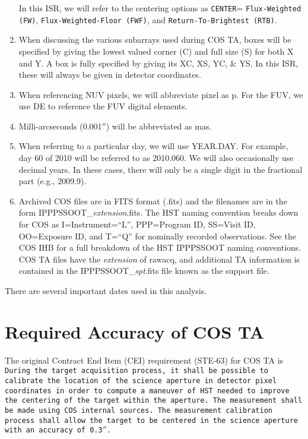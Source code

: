 \documentclass[12pt]{article}
\newcommand{\arcsec}{\ensuremath{''}}
\newcommand{\psiafdate}{2010.060}
\begin{document}
\begin{enumerate}
{		In this ISR, we will refer to the centering options as \texttt{CENTER}= \texttt{Flux-Weighted (FW)},
		 \texttt{Flux-Weighted-Floor (FWF)}, and \texttt{Return-To-Brightest (RTB)}.
	}
	\item{When discussing the various subarrays used during COS TA, boxes will be specified by giving the lowest
		valued corner (C) and full size (S) for both X and Y. A box is fully specified by
		giving its XC, XS, YC, \& YS. In this ISR, these will always be given in detector coordinates.}
	\item{When referencing NUV pixels, we will abbreviate pixel as p. For the FUV, we use DE to reference the FUV digital elements.}
	\item{Milli-arcseconds (0.001\arcsec) will be abbreviated as mas. }
	\item{When referring to a particular day, we will use YEAR.DAY. For example, day 60 of 2010 will be referred to as \psiafdate. We will also occasionally use decimal years. In these cases, there will only be a single digit in the fractional part (e.g., 2009.9).}
	\item{Archived COS files are in FITS format (.fits) and the filenames are in the form {\sf IPPPSSOOT\_{\it extension}.fits}.
The HST naming convention breaks down for COS as I=Instrument=``L'', PPP=Program ID, SS=Visit ID, OO=Exposure ID,
and T=``Q'' for nominally recorded observations. See the COS IHB for a full breakdown of the HST IPPPSSOOT naming conventions.
COS TA files have the {\it extension} of {\sf rawacq}, and additional
TA information is contained in the {\sf IPPPSSOOT\_{\it spt}.fits} file known as the support file.}
\end{enumerate}
	There are several important dates used in this analysis.
\clearpage
\vspace{-0.4cm}
\section{Required Accuracy of COS TA}\label{sec:accuracy}
\vspace{-0.3cm}
The original Contract End Item (CEI) requirement (STE-63) for COS TA is \\

\footnotesize
\noindent \texttt{During the target acquisition process, it shall be possible to calibrate the location of the science aperture in detector pixel
coordinates in order to compute a maneuver of HST needed to improve the centering of the target within the aperture.
The measurement shall be made using COS internal sources.
The measurement calibration process shall allow the target to be centered
in the science aperture with an accuracy of 0.3\arcsec.}\\
\end{document}
